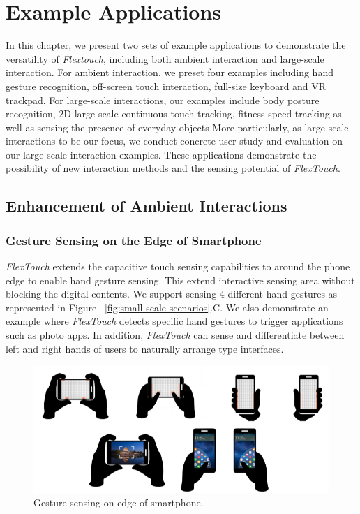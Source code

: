 \chapter{Example Applications}
In this chapter, we present two sets of example applications to demonstrate the versatility of \textit{Flextouch}, including both ambient interaction and large-scale interaction. For ambient interaction, we preset four examples including hand gesture recognition, off-screen touch interaction, full-size keyboard and VR trackpad. For large-scale interactions, our examples include body posture recognition, 2D large-scale continuous touch tracking, fitness speed tracking as well as sensing the presence of everyday objects
More particularly, as large-scale interactions to be our focus, we conduct concrete user study and evaluation on our large-scale interaction examples.
These applications demonstrate the possibility of new interaction methods and the sensing potential of \emph{FlexTouch}.

\section{Enhancement of Ambient Interactions}
\subsection{Gesture Sensing on the Edge of Smartphone}
\textit{FlexTouch} extends the capacitive touch sensing capabilities to around the phone edge to enable hand gesture sensing. This extend interactive sensing area without blocking the digital contents. We support sensing 4 different hand gestures as represented in Figure ~\ref{fig:small-scale-scenarios}.C. We also demonstrate an example where \textit{FlexTouch} detects specific hand gestures to trigger applications such as photo apps. In addition, \textit{FlexTouch} can sense and differentiate between left and right hands of users to naturally arrange type interfaces.

\begin{figure}[ht]
  \centering
    \includegraphics[width=0.95\columnwidth]{figures/hand-gesture.png}
    \setlength{\belowcaptionskip}{-6pt}
    \caption{Gesture sensing on edge of smartphone.}
    \label{fig:hand-gesture}
  \end{figure}

